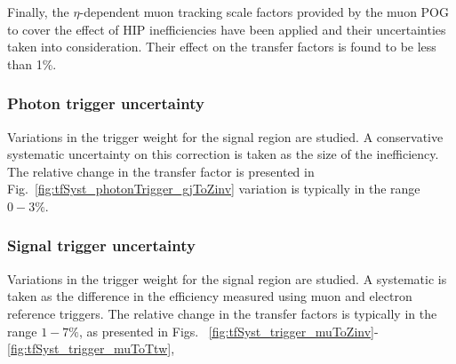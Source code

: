 Finally, the $\eta$-dependent muon tracking scale factors provided by the muon 
POG to cover the effect of HIP inefficiencies have been applied and their 
uncertainties taken into consideration. Their effect on the transfer factors
is found to be less than 1\%.

\subsubsection*{Photon trigger uncertainty}
\label{sec:tfSyst_photonTrigger}

Variations in the trigger weight for the signal region are studied. A conservative systematic
uncertainty on this correction is taken as the size of the inefficiency. 
The relative change in the \gj transfer factor is presented in Fig.~\ref{fig:tfSyst_photonTrigger_gjToZinv}
variation is typically in the range $0-3\%$.

\subsubsection*{Signal trigger uncertainty}
\label{sec:tfSyst_trigger}

Variations in the trigger weight for the signal region are studied. A systematic is taken
as the difference in the efficiency measured using muon and electron reference triggers.
The relative change in the transfer factors is typically in the range
$1-7\%$, as presented in Figs.
~\ref{fig:tfSyst_trigger_muToZinv}-\ref{fig:tfSyst_trigger_muToTtw}, 

%

%

